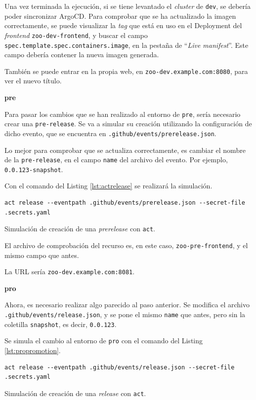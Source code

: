 \begin{enumerate}
    Una vez terminada la ejecución, si se tiene levantado el \textit{cluster} de \texttt{dev}, se debería poder sincronizar ArgoCD. Para comprobar que se ha actualizado la imagen correctamente, se puede visualizar la \textit{tag} que está en uso en el Deployment del \textit{frontend} \texttt{zoo-dev-frontend}, y buscar el campo \texttt{spec.template.spec.containers.image}, en la pestaña de ``\textit{Live manifest}''. Este campo debería contener la nueva imagen generada.

    También se puede entrar en la propia web, en \texttt{zoo-dev.example.com:8080}, para ver el nuevo título.

    \textbf{pre}

    Para pasar los cambios que se han realizado al entorno de \texttt{pre}, sería necesario crear una \texttt{pre-release}. Se va a simular su creación utilizando la configuración de dicho evento, que se encuentra en \texttt{.github/events/prerelease.json}.

    Lo mejor para comprobar que se actualiza correctamente, es cambiar el nombre de la \texttt{pre-release}, en el campo \texttt{name} del archivo del evento. Por ejemplo, \texttt{0.0.123-snapshot}.

    Con el comando del Listing \ref{lst:actrelease} se realizará la simulación.

\begin{listing}[!ht]
  \begin{verbatim}
act release --eventpath .github/events/prerelease.json --secret-file .secrets.yaml
  \end{verbatim}
  \caption{Simulación de creación de una \textit{prerelease} con \texttt{act}.}
  \label{lst:actrelease}
\end{listing}

    El archivo de comprobación del recurso es, en este caso, \texttt{zoo-pre-frontend}, y el mismo campo que antes.

    La URL sería \texttt{zoo-dev.example.com:8081}.

    \textbf{pro}

    Ahora, es necesario realizar algo parecido al paso anterior. Se modifica el archivo \texttt{.github/events/release.json}, y se pone el mismo \texttt{name} que antes, pero sin la coletilla \texttt{snapshot}, es decir, \texttt{0.0.123}.

    Se simula el cambio al entorno de \texttt{pro} con el comando del Listing \ref{lst:propromotion}.

\begin{listing}[!ht]
  \begin{verbatim}
act release --eventpath .github/events/release.json --secret-file .secrets.yaml
  \end{verbatim}
  \caption{Simulación de creación de una \textit{release} con \texttt{act}.}
    \label{lst:propromotion}
\end{listing}

\end{enumerate}

